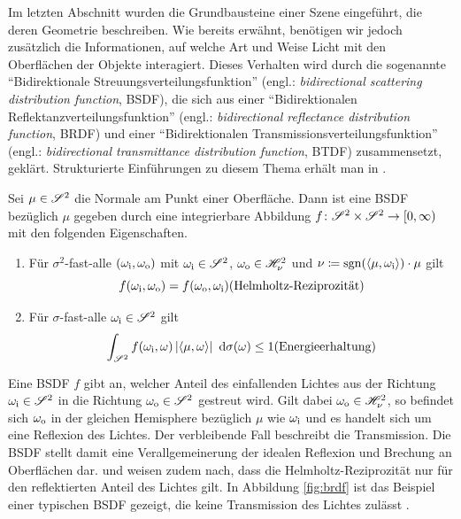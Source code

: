 		Im letzten Abschnitt wurden die Grundbausteine einer Szene eingeführt, die deren Geometrie beschreiben.
		Wie bereits erwähnt, benötigen wir jedoch zusätzlich die Informationen, auf welche Art und Weise Licht mit den Oberflächen der Objekte interagiert.
		Dieses Verhalten wird durch die sogenannte \enquote{Bidirektionale Streuungsverteilungsfunktion} (engl.: \textit{bidirectional scattering distribution function}, BSDF), die sich aus einer \enquote{Bidirektionalen Reflektanzverteilungsfunktion} (engl.: \textit{bidirectional reflectance distribution function}, BRDF) und einer \enquote{Bidirektionalen Transmissionsverteilungsfunktion} (engl.: \textit{bidirectional transmittance distribution function}, BTDF) zusammensetzt, geklärt.
		Strukturierte Einführungen zu diesem Thema erhält man in \cite{pbrt3,veach-thesis,real-time-render,intro-brdf,radiosity}.
		\begin{definition}
			Sei $\mu\in\mathscr{S}^{2}$ die Normale am Punkt einer Oberfläche.
			Dann ist eine BSDF bezüglich $\mu$ gegeben durch eine integrierbare Abbildung $f\colon\mathscr{S}^{2}\times\mathscr{S}^{2}\to[0,\infty)$ mit den folgenden Eigenschaften.

			\begin{enumerate}[label = \normalfont{(\roman*)}]
				\item
				Für $\sigma^2$-fast-alle $(\omega_{\mathrm{i}},\omega_{\mathrm{o}})$ mit $\omega_{\mathrm{i}}\in\mathscr{S}^{2}$, $\omega_{\mathrm{o}}\in\mathscr{H}^{2}_{\nu}$ und $\nu\coloneqq\operatorname{sgn}(\left\langle \mu,\omega_{\mathrm{i}} \right\rangle)\cdot\mu$ gilt
				\[
					f(\omega_\m{i},\omega_\m{o}) = f(\omega_\m{o},\omega_\m{i}) \hfill \text{(Helmholtz-Reziprozität)}
				\]

				\item
				Für $\sigma$-fast-alle $\omega_{\mathrm{i}}\in\mathscr{S}^{2}$ gilt
				\[
					\integral{\ssp}{}{f(\omega_\m{i},\omega) \abs{\dotp{\mu}{\omega}}}{\sigma(\omega)} \leq 1 \hfill \text{(Energieerhaltung)}
				\]
			\end{enumerate}
		\end{definition}

		Eine BSDF $f$ gibt an, welcher Anteil des einfallenden Lichtes aus der Richtung $\omega_{\mathrm{i}}\in\mathscr{S}^{2}$ in die Richtung $\omega_{\mathrm{o}}\in\mathscr{S}^{2}$ gestreut wird.
		Gilt dabei $\omega_{\mathrm{o}}\in\mathscr{H}^{2}_{\nu}$, so befindet sich $\omega_{\mathrm{o}}$ in der gleichen Hemisphere bezüglich $\mu$ wie $\omega_{\mathrm{i}}$ und es handelt sich um eine Reflexion des Lichtes.
		Der verbleibende Fall beschreibt die Transmission.
		Die BSDF stellt damit eine Verallgemeinerung der idealen Reflexion und Brechung an Oberflächen dar.
		\cite[S.~571~ff]{pbrt3} und \cite[S.~135~ff]{veach-thesis} weisen zudem nach, dass die Helmholtz-Reziprozität nur für den reflektierten Anteil des Lichtes gilt.
		In Abbildung \ref{fig:brdf} ist das Beispiel einer typischen BSDF gezeigt, die keine Transmission des Lichtes zulässt \cite[S.~509~ff]{pbrt3}.

